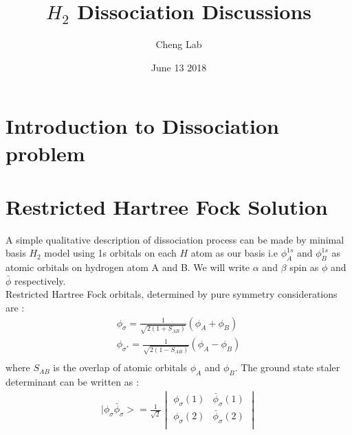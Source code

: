 \documentclass[11pt]{article}   	%
\begin{document}
\title{$H_2$ Dissociation Discussions}
\author{Cheng Lab}
\date{June 13 2018}							%
\maketitle
\section{Introduction to Dissociation problem}
\section{Restricted Hartree Fock Solution}
	A simple qualitative description of dissociation process can be made by minimal basis 
	$H_2$ model using 1s orbitals on each $H$ atom as our basis
	i.e $\phi_A^{1s}$ and $\phi_B^{1s}$ as atomic orbitals on hydrogen atom A and B.  
	We will write $\alpha$ and $\beta$ spin as $\phi$ and $\bar{\phi}$ respectively. \\
	Restricted Hartree Fock orbitals, determined by pure symmetry considerations are :\\ 
	\begin{equation}
	\begin{split}
	\phi_{\sigma}=\frac{1}{\sqrt{2(1+S_{AB})}}(\phi_A+\phi_B) \\	
	\phi_{\sigma^*}=\frac{1}{\sqrt{2(1-S_{AB})}}(\phi_A-\phi_B) \\
	\end{split}
	\end{equation}
	where $S_{AB}$ is the overlap of atomic orbitals $\phi_A$ and $\phi_B$. The ground state staler determinant can be written as :\\
	\begin{equation}
	\begin{split}
	|\phi_{\sigma}\bar{\phi}_{\sigma}>=\frac{1}{\sqrt{2}} \begin{vmatrix}\phi_{\sigma}(1) 
	& \bar{\phi}_{\sigma}(1) \\  \phi_{\sigma}(2) & \bar{\phi}_{\sigma}(2) \\ \end{vmatrix}  \\
	\end{split}
	\end{equation}
	
\end{document}
